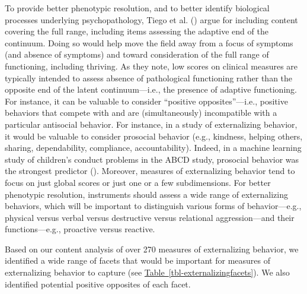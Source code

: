 \documentclass[
  american,
  letterpaper,
  12pt]{article}
\newlength{\apatablekeepdepth}
\newcommand{\apatablekeep}{%
  \par\setlength{\apatablekeepdepth}{\prevdepth}%
  \setbox\apatablekeepbox\vbox\bgroup\prevdepth\apatablekeepdepth}
\newlength{\apatablenotegap}
\begin{document}
To provide better phenotypic resolution, and to better identify
biological processes underlying psychopathology, {Tiego et al.}
() argue for including content covering
the full range, including items assessing the adaptive end of the
continuum. Doing so would help move the field away from a focus of
symptoms (and absence of symptoms) and toward consideration of the full
range of functioning, including thriving. As they note, low scores on
clinical measures are typically intended to assess absence of
pathological functioning rather than the opposite end of the latent
continuum---i.e., the presence of adaptive functioning. For instance, it
can be valuable to consider ``positive opposites''---i.e., positive
behaviors that compete with and are (simultaneously) incompatible with a
particular antisocial behavior. For instance, in a study of
externalizing behavior, it would be valuable to consider prosocial
behavior (e.g., kindness, helping others, sharing, dependability,
compliance, accountability). Indeed, in a machine learning study of
children's conduct problems in the ABCD study, prosocial behavior was
the strongest predictor (). Moreover, measures of externalizing behavior tend to focus on
just global scores or just one or a few subdimensions. For better
phenotypic resolution, instruments should assess a wide range of
externalizing behaviors, which will be important to distinguish various
forms of behavior---e.g., physical versus verbal versus destructive
versus relational aggression---and their functions---e.g., proactive
versus reactive.

Based on our content analysis of over 270 measures of externalizing
behavior, we identified a wide range of facets that would be important
for measures of externalizing behavior to capture (see
\hyperref[tbl-externalizingfacets]{Table~\ref*{tbl-externalizingfacets}}).
We also identified potential positive opposites of each facet.

\par\addvspace{\baselineskip}\begingroup

\setlength{\LTleft}{0pt}\setlength{\LTright}{\fill}\setlength{\LTpost}{0pt}\setlength{\apatablenotegap}{-0.5pt}

\setlength{\LTpre}{16pt}

\apatablekeep

\setcounter{table}{0}

\def\theHtable{\arabic{table}}%
%
\makeatletter\def\@currentlabel{1}\makeatother%
\label{tbl-externalizingfacets}
\end{document}
